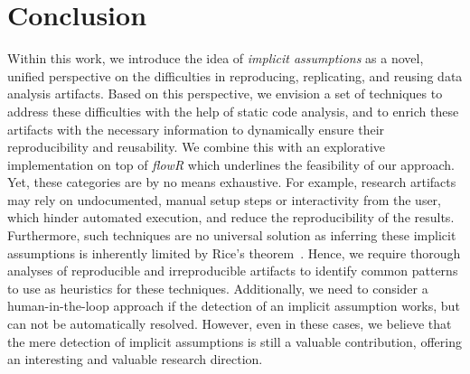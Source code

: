 \section{Conclusion}\label{sec:conclusion}
Within this work, we introduce the idea of \textit{implicit assumptions} as a novel, unified perspective on the difficulties in reproducing, replicating, and reusing data analysis artifacts. 
Based on this perspective, we envision a set of techniques to address these difficulties with the help of static code analysis, and to enrich these artifacts with the necessary information to dynamically ensure their reproducibility and reusability. We combine this with an explorative implementation on top of \textit{flowR} which underlines the feasibility of our approach.
Yet, these categories are by no means exhaustive. For example, research artifacts may rely on undocumented, manual setup steps or interactivity from the user,
which hinder automated execution, and reduce the reproducibility of the
results.
Furthermore, such techniques are no universal solution as inferring these implicit assumptions is inherently limited by Rice's theorem~\cite{rice1953classes}.
Hence, we require thorough analyses of reproducible and irreproducible artifacts to identify common patterns to use as heuristics for these techniques. 
Additionally, we need to consider a human-in-the-loop approach if the detection of an implicit assumption works, but can not be automatically resolved.
However, even in these cases, we believe that the mere detection of implicit assumptions is still a valuable contribution, offering an interesting and valuable research direction.

